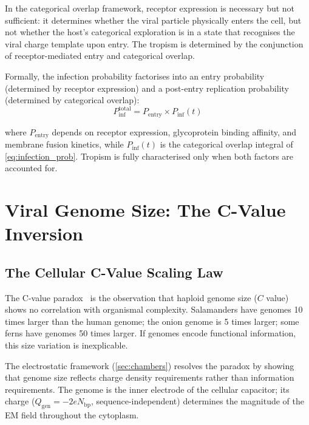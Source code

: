 \documentclass[12pt,a4paper]{article}
\theoremstyle{definition}
\theoremstyle{remark}
\newcommand{\Qgen}{Q_{\mathrm{gen}}}
\begin{document}
In the categorical overlap framework, receptor expression is necessary but not sufficient: it determines whether the viral particle physically enters the cell, but not whether the host's categorical exploration is in a state that recognises the viral charge template upon entry. The tropism is determined by the conjunction of receptor-mediated entry and categorical overlap.

Formally, the infection probability factorises into an entry probability (determined by receptor expression) and a post-entry replication probability (determined by categorical overlap):
\begin{equation}
  P_{\mathrm{inf}}^{\mathrm{total}} = P_{\mathrm{entry}} \times P_{\mathrm{inf}}(t)
  \label{eq:total_infection}
\end{equation}

where $P_{\mathrm{entry}}$ depends on receptor expression, glycoprotein binding affinity, and membrane fusion kinetics, while $P_{\mathrm{inf}}(t)$ is the categorical overlap integral of \cref{eq:infection_prob}. Tropism is fully characterised only when both factors are accounted for.

\section{Viral Genome Size: The C-Value Inversion}
\label{sec:cvalue}

\subsection{The Cellular C-Value Scaling Law}

The C-value paradox~\cite{Thomas1971,Gregory2001} is the observation that haploid genome size ($C$ value) shows no correlation with organismal complexity. Salamanders have genomes 10 times larger than the human genome; the onion genome is 5 times larger; some ferns have genomes 50 times larger. If genomes encode functional information, this size variation is inexplicable.

The electrostatic framework (\cref{sec:chambers}) resolves the paradox by showing that genome size reflects charge density requirements rather than information requirements. The genome is the inner electrode of the cellular capacitor; its charge ($\Qgen = -2e N_{\mathrm{bp}}$, sequence-independent) determines the magnitude of the EM field throughout the cytoplasm.
\end{document}
